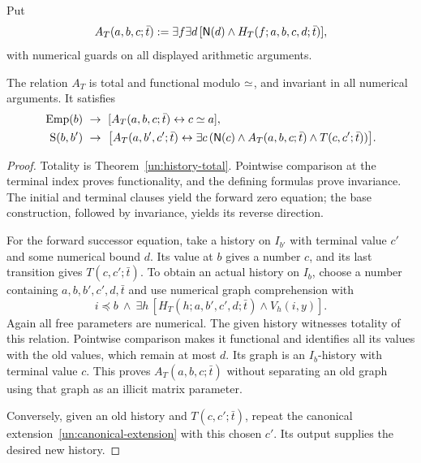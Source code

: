 Put
\[
 A_T(a,b,c;\bar t):=\exists f\exists d\,
                     [\mathsf{N}(d)\land H_T(f;a,b,c,d;\bar t)],
\]
with numerical guards on all displayed arithmetic arguments.

\begin{lemma}\label{un:recursion-equations}
The relation $A_T$ is total and functional modulo $\mathrel{\simeq}$, and invariant
in all numerical arguments. It satisfies
\begin{align}
 \operatorname{Emp}(b)&\ \to\
       [A_T(a,b,c;\bar t)\leftrightarrow c\mathrel{\simeq} a],
                                                     \label{un:rec-zero}\\
 \operatorname{S}(b,b')&\ \to\
 \bigl[A_T(a,b',c';\bar t)\leftrightarrow
 \exists c\,(\mathsf{N}(c)\land A_T(a,b,c;\bar t)\land T(c,c';\bar t))\bigr].
                                                     \label{un:rec-step}
\end{align}
\end{lemma}
\begin{proof}
Totality is Theorem~\ref{un:history-total}. Pointwise comparison at the
terminal index proves functionality, and the defining formulas prove
invariance. The initial and terminal clauses yield the forward zero
equation; the base construction, followed by invariance, yields its
reverse direction.

For the forward successor equation, take a history on $I_{b'}$ with
terminal value $c'$ and some numerical bound $d$. Its value at $b$
gives a number $c$, and its last transition gives $T(c,c';\bar t)$.
To obtain an actual history on $I_b$, choose a number containing
$a,b,b',c',d,\bar t$ and use numerical graph comprehension with
\begin{equation}\label{un:canonical-restriction}
 i\preccurlyeq b\ \land\
       \exists h\,[H_T(h;a,b',c',d;\bar t)\land V_h(i,y)].
\end{equation}
Again all free parameters are numerical. The given history witnesses
totality of this relation. Pointwise comparison makes it functional and
identifies all its values with the old values, which remain at most
$d$. Its graph is an $I_b$-history with terminal value $c$. This proves
$A_T(a,b,c;\bar t)$ without separating an old graph using that graph
as an illicit matrix parameter.

Conversely, given an old history and $T(c,c';\bar t)$, repeat the
canonical extension~\eqref{un:canonical-extension} with this chosen
$c'$. Its output supplies the desired new history.
\end{proof}

